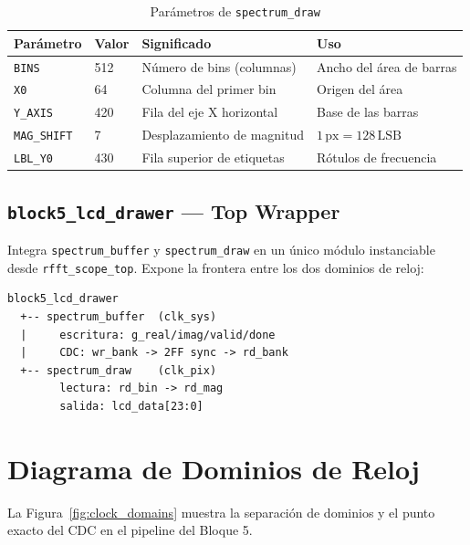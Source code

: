 \documentclass[12pt, a4paper]{article}
\begin{document}
\begin{table}[H]
\centering
\caption{Parámetros de \texttt{spectrum\_draw}}
\begin{tabular}{p{2.5cm} p{2cm} p{5cm} p{3.5cm}}
\toprule
\textbf{Parámetro} & \textbf{Valor} & \textbf{Significado} & \textbf{Uso} \\
\midrule
\texttt{BINS}      & 512  & Número de bins (columnas) & Ancho del área de barras \\
\texttt{X0}        & 64   & Columna del primer bin    & Origen del área \\
\texttt{Y\_AXIS}   & 420  & Fila del eje X horizontal & Base de las barras \\
\texttt{MAG\_SHIFT} & 7    & Desplazamiento de magnitud & $1\,\text{px} = 128\,\text{LSB}$ \\
\texttt{LBL\_Y0}   & 430  & Fila superior de etiquetas & Rótulos de frecuencia \\
\bottomrule
\end{tabular}
\end{table}

\subsection{\texttt{block5\_lcd\_drawer} — Top Wrapper}

Integra \texttt{spectrum\_buffer} y \texttt{spectrum\_draw} en un único
módulo instanciable desde \texttt{rfft\_scope\_top}. Expone la frontera
entre los dos dominios de reloj:

\begin{verbatim}
block5_lcd_drawer
  +-- spectrum_buffer  (clk_sys)
  |     escritura: g_real/imag/valid/done
  |     CDC: wr_bank -> 2FF sync -> rd_bank
  +-- spectrum_draw    (clk_pix)
        lectura: rd_bin -> rd_mag
        salida: lcd_data[23:0]
\end{verbatim}

\section{Diagrama de Dominios de Reloj}

La Figura~\ref{fig:clock_domains} muestra la separación de dominios y el
punto exacto del CDC en el pipeline del Bloque 5.
\end{document}
